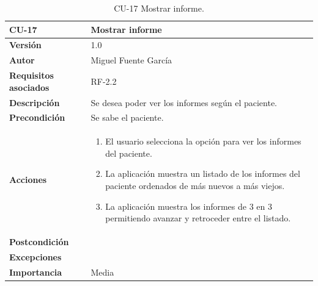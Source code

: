 \begin{table}[p]
	\centering
	\begin{tabularx}{\linewidth}{ p{} p{} }
		\toprule
		\textbf{CU-17}    & \textbf{Mostrar informe}\\
		\toprule
		\textbf{Versión}              & 1.0    \\
		\textbf{Autor}                & Miguel Fuente García \\
		\textbf{Requisitos asociados} & RF-2.2 \\
		\textbf{Descripción}          & Se desea poder ver los informes según el paciente. \\
		\textbf{Precondición}         & Se sabe el paciente. \\
		\textbf{Acciones}             &
		\begin{enumerate}
			\def\labelenumi{\arabic{enumi}.}
			\tightlist
			\item El usuario selecciona la opción para ver los informes del paciente.
            \item La aplicación muestra un listado de los informes del paciente ordenados de más nuevos a más viejos.
            \item La aplicación muestra los informes de 3 en 3 permitiendo avanzar y retroceder entre el listado.
		\end{enumerate}\\
		\textbf{Postcondición}        &  \\
		\textbf{Excepciones}          &  \\
		\textbf{Importancia}          & Media  \\
		\bottomrule
	\end{tabularx}
	\caption{CU-17 Mostrar informe.}
\end{table}

